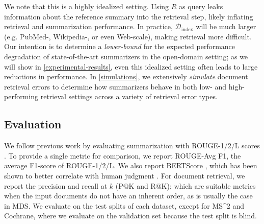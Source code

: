 \documentclass[11pt]{article}
\newcommand\mstoo{{MS\^{}2}\xspace}
\begin{document}
\noindent We note that this is a highly idealized setting. Using \(R\) as query leaks information about the reference summary into the retrieval step, likely inflating retrieval and summarization performance. In practice, \(\mathcal{D}_{\text{index}}\) will be much larger (e.g. PubMed-, Wikipedia-, or even Web-scale), making retrieval more difficult. Our intention is to determine a \textit{lower-bound} for the expected performance degradation of state-of-the-art summarizers in the open-domain setting; as we will show in \textsection \ref{experimental-results}, even this idealized setting often leads to large reductions in performance. In \textsection \ref{simulations}, we extensively \textit{simulate} document retrieval errors to determine how summarizers behave in both low- and high-performing retrieval settings across a variety of retrieval error types.

\subsection{Evaluation} \label{experimental-setup:evaluation}


We follow previous work by evaluating summarization with ROUGE-1/2/L scores \citep{lin-2004-rouge}. To provide a single metric for comparison, we report ROUGE-Avg F1, the average F1-score of ROUGE-1/2/L. We also report BERTScore \citep{bertscore}, which has been shown to better correlate with human judgment \citep{bartscore, Fischer2022MeasuringFO}. For document retrieval, we report the precision and recall at \(k\) (P@K and R@K); which are suitable metrics when the input documents do not have an inherent order, as is usually the case in MDS. We evaluate on the test splits of each dataset, except for \mstoo and Cochrane, where we evaluate on the validation set because the test split is blind.
\end{document}
